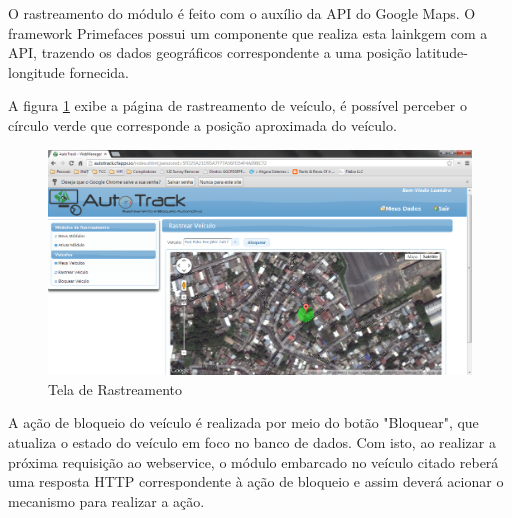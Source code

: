O rastreamento do módulo é feito com o auxílio da API do Google Maps. O framework Primefaces possui um componente que realiza esta lainkgem com a API, trazendo os dados geográficos correspondente a uma posição latitude-longitude fornecida.

A figura \ref{fig:webmanviewrastrear} exibe a página de rastreamento de veículo, é possível perceber o círculo verde que corresponde a posição aproximada do veículo.

\begin{figure}[!htb]
	\centering
	\includegraphics[width=\textwidth]{figures/webmanager_rastrear.png}
	\caption{Tela de Rastreamento}
	\label{fig:webmanviewrastrear}
\end{figure}

A ação de bloqueio do veículo é realizada por meio do botão "Bloquear", que atualiza o estado do veículo em foco no banco de dados. Com isto, ao realizar a próxima requisição ao webservice, o módulo embarcado no veículo citado reberá uma resposta HTTP correspondente à ação de bloqueio e assim deverá acionar o mecanismo para realizar a ação.

\hfill

